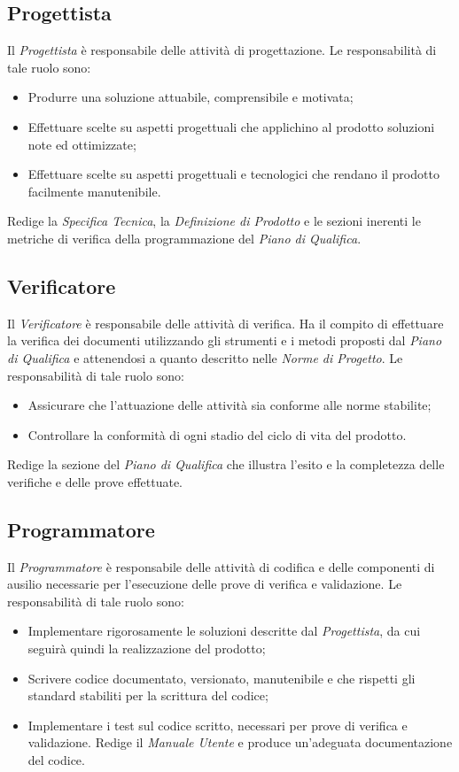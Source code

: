 \subsection{Progettista}
Il \textit{Progettista} è responsabile delle attività di progettazione. Le responsabilità di tale ruolo sono:
\begin{itemize}
\item Produrre una soluzione attuabile, comprensibile e motivata;
\item Effettuare scelte su aspetti progettuali che applichino al prodotto soluzioni note
ed ottimizzate;
\item Effettuare scelte su aspetti progettuali e tecnologici che rendano il prodotto facilmente manutenibile.
\end{itemize}
Redige la \textit{Specifica Tecnica}, la \textit{Definizione di Prodotto} e le sezioni inerenti le metriche di verifica della programmazione del \textit{Piano di Qualifica}.

\subsection{Verificatore}
Il \textit{Verificatore} è responsabile delle attività di verifica. Ha il compito di effettuare la verifica dei documenti utilizzando gli strumenti e i metodi proposti dal \textit{Piano di Qualifica}
e attenendosi a quanto descritto nelle \textit{Norme di Progetto}. Le responsabilità di tale ruolo sono:
\begin{itemize}

\item Assicurare che l'attuazione delle attività sia conforme alle norme stabilite;
\item Controllare la conformità di ogni stadio del ciclo di vita del prodotto.
\end{itemize}
Redige la sezione del \textit{Piano di Qualifica} che illustra l'esito e la completezza delle verifiche e delle prove effettuate.

\subsection{Programmatore}
Il \textit{Programmatore} è responsabile delle attività di codifica e delle componenti di ausilio necessarie per l'esecuzione delle prove di verifica e validazione. Le responsabilità di tale
ruolo sono:
\begin{itemize}
\item Implementare rigorosamente le soluzioni descritte dal \textit{Progettista}, da cui seguirà quindi la realizzazione del prodotto;
\item Scrivere codice documentato, versionato, manutenibile e che rispetti gli standard stabiliti per la scrittura del codice;
\item Implementare i test sul codice scritto, necessari per prove di verifica e validazione.
Redige il \textit{Manuale Utente} e produce un'adeguata documentazione del codice.
\end{itemize}